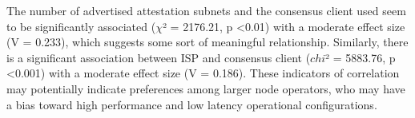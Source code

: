\documentclass[conference]{IEEEtran}
\begin{document}
The number of advertised attestation subnets and the consensus client used seem to be significantly associated ($\chi$² = 2176.21, p \textless 0.01) with a moderate effect size (V = 0.233), which suggests some sort of meaningful relationship. Similarly, there is a significant association between ISP and consensus client ($chi$² = 5883.76, p \textless 0.001) with a moderate effect size (V = 0.186). These indicators of correlation may potentially indicate preferences among larger node operators, who may have a bias toward high performance and low latency operational configurations.

\end{document}
